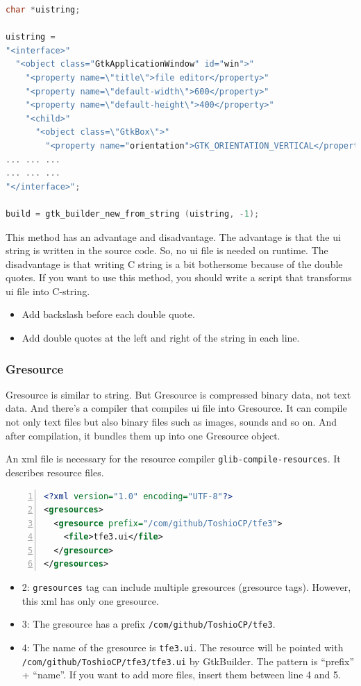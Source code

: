 \begin{lstlisting}[language=C]
char *uistring;

uistring =
"<interface>"
  "<object class="GtkApplicationWindow" id="win">"
    "<property name=\"title\">file editor</property>"
    "<property name=\"default-width\">600</property>"
    "<property name=\"default-height\">400</property>"
    "<child>"
      "<object class=\"GtkBox\">"
        "<property name="orientation">GTK_ORIENTATION_VERTICAL</property>"
... ... ...
... ... ...
"</interface>";

build = gtk_builder_new_from_string (uistring, -1);
\end{lstlisting}

This method has an advantage and disadvantage. The advantage is that the
ui string is written in the source code. So, no ui file is needed on
runtime. The disadvantage is that writing C string is a bit bothersome
because of the double quotes. If you want to use this method, you should
write a script that transforms ui file into C-string.

\begin{itemize}
\tightlist
\item
  Add backslash before each double quote.
\item
  Add double quotes at the left and right of the string in each line.
\end{itemize}

\subsubsection{Gresource}\label{gresource}

Gresource is similar to string. But Gresource is compressed binary data,
not text data. And there's a compiler that compiles ui file into
Gresource. It can compile not only text files but also binary files such
as images, sounds and so on. And after compilation, it bundles them up
into one Gresource object.

An xml file is necessary for the resource compiler
\passthrough{\lstinline!glib-compile-resources!}. It describes resource
files.

\begin{lstlisting}[language=XML, numbers=left]
<?xml version="1.0" encoding="UTF-8"?>
<gresources>
  <gresource prefix="/com/github/ToshioCP/tfe3">
    <file>tfe3.ui</file>
  </gresource>
</gresources>
\end{lstlisting}

\begin{itemize}
\tightlist
\item
  2: \passthrough{\lstinline!gresources!} tag can include multiple
  gresources (gresource tags). However, this xml has only one gresource.
\item
  3: The gresource has a prefix
  \passthrough{\lstinline!/com/github/ToshioCP/tfe3!}.
\item
  4: The name of the gresource is \passthrough{\lstinline!tfe3.ui!}. The
  resource will be pointed with
  \passthrough{\lstinline!/com/github/ToshioCP/tfe3/tfe3.ui!} by
  GtkBuilder. The pattern is ``prefix'' + ``name''. If you want to add
  more files, insert them between line 4 and 5.
\end{itemize}

